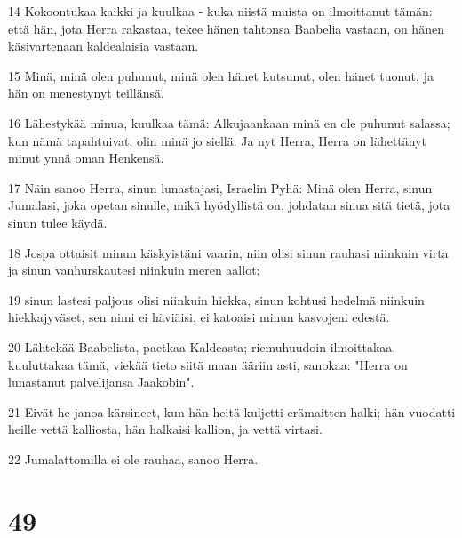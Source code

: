 \par 14 Kokoontukaa kaikki ja kuulkaa - kuka niistä muista on ilmoittanut tämän: että hän, jota Herra rakastaa, tekee hänen tahtonsa Baabelia vastaan, on hänen käsivartenaan kaldealaisia vastaan.
\par 15 Minä, minä olen puhunut, minä olen hänet kutsunut, olen hänet tuonut, ja hän on menestynyt teillänsä.
\par 16 Lähestykää minua, kuulkaa tämä: Alkujaankaan minä en ole puhunut salassa; kun nämä tapahtuivat, olin minä jo siellä. Ja nyt Herra, Herra on lähettänyt minut ynnä oman Henkensä.
\par 17 Näin sanoo Herra, sinun lunastajasi, Israelin Pyhä: Minä olen Herra, sinun Jumalasi, joka opetan sinulle, mikä hyödyllistä on, johdatan sinua sitä tietä, jota sinun tulee käydä.
\par 18 Jospa ottaisit minun käskyistäni vaarin, niin olisi sinun rauhasi niinkuin virta ja sinun vanhurskautesi niinkuin meren aallot;
\par 19 sinun lastesi paljous olisi niinkuin hiekka, sinun kohtusi hedelmä niinkuin hiekkajyväset, sen nimi ei häviäisi, ei katoaisi minun kasvojeni edestä.
\par 20 Lähtekää Baabelista, paetkaa Kaldeasta; riemuhuudoin ilmoittakaa, kuuluttakaa tämä, viekää tieto siitä maan ääriin asti, sanokaa: "Herra on lunastanut palvelijansa Jaakobin".
\par 21 Eivät he janoa kärsineet, kun hän heitä kuljetti erämaitten halki; hän vuodatti heille vettä kalliosta, hän halkaisi kallion, ja vettä virtasi.
\par 22 Jumalattomilla ei ole rauhaa, sanoo Herra.

\chapter{49}

